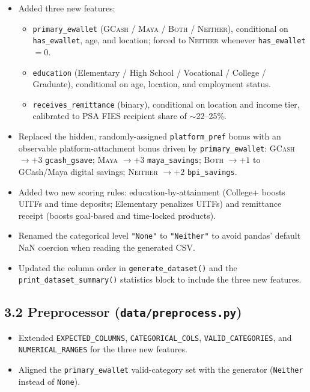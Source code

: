 \documentclass[11pt,a4paper]{article}
\begin{document}
\begin{itemize}
    \item Added three new features:
    \begin{itemize}
        \item \texttt{primary\_ewallet} (\textsc{GCash} / \textsc{Maya} /
        \textsc{Both} / \textsc{Neither}), conditional on
        \texttt{has\_ewallet}, age, and location; forced to
        \textsc{Neither} whenever \texttt{has\_ewallet} $= 0$.
        \item \texttt{education} (Elementary / High School / Vocational /
        College / Graduate), conditional on age, location, and
        employment status.
        \item \texttt{receives\_remittance} (binary), conditional on
        location and income tier, calibrated to PSA FIES recipient share
        of $\sim$22--25\%.
    \end{itemize}
    \item Replaced the hidden, randomly-assigned \texttt{platform\_pref}
    bonus with an observable platform-attachment bonus driven by
    \texttt{primary\_ewallet}: \textsc{GCash} $\to+3$ \texttt{gcash\_gsave};
    \textsc{Maya} $\to+3$ \texttt{maya\_savings}; \textsc{Both} $\to+1$ to
    GCash/Maya digital savings; \textsc{Neither} $\to+2$
    \texttt{bpi\_savings}.
    \item Added two new scoring rules: education-by-attainment (College+ boosts
    UITFs and time deposits; Elementary penalizes UITFs) and
    remittance receipt (boosts goal-based and time-locked products).
    \item Renamed the categorical level \texttt{"None"} to \texttt{"Neither"}
    to avoid pandas' default NaN coercion when reading the generated CSV.
    \item Updated the column order in \texttt{generate\_dataset()} and the
    \texttt{print\_dataset\_summary()} statistics block to include the three
    new features.
\end{itemize}

\subsection*{3.2 Preprocessor (\texttt{data/preprocess.py})}

\begin{itemize}
    \item Extended \texttt{EXPECTED\_COLUMNS}, \texttt{CATEGORICAL\_COLS},
    \texttt{VALID\_CATEGORIES}, and \texttt{NUMERICAL\_RANGES} for the
    three new features.
    \item Aligned the \texttt{primary\_ewallet} valid-category set with
    the generator (\texttt{Neither} instead of \texttt{None}).
\end{itemize}
\end{document}
